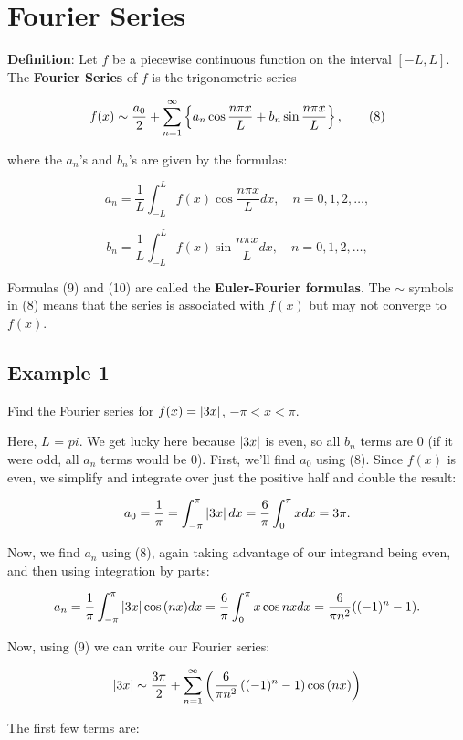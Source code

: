 \documentclass{article}
\begin{document}
\section{Fourier Series}

\textbf{Definition}: Let $f$ be a piecewise continuous function on the \@{interval} $[-L, L]$. The \textbf{Fourier Series} of $f$ is the trigonometric series

\[ f(x) \sim \frac{a_0}{2} + \sum_{n=1}^{\infty} \left\{ a_n \cos{\frac{n \pi x}{L}} + b_n \sin{\frac{n \pi x}{L}} \right\}, \tag{8} \] 

where the $a_n$'s and $b_n$'s are given by the formulas:

\[ a_n = \frac{1}{L} \int_{-L}^{L} f(x) \cos{\frac{n \pi x}{L}} dx, \quad n = 0, 1, 2, \dots, \tag{9} \]

\[ b_n = \frac{1}{L} \int_{-L}^{L} f(x) \sin{\frac{n \pi x}{L}} dx, \quad n = 0, 1, 2, \dots, \tag{10} \]

Formulas (9) and (10) are called the \textbf{Euler-Fourier formulas}. The $\sim$ symbols in (8) means that the series is associated with $f(x)$ but may not converge to $f(x)$.

\subsection{Example 1}

Find the Fourier series for $f(x) = \left| 3x \right|$, $-\pi < x < \pi$.

Here, $L$ = $pi$. We get lucky here because $\left| 3x \right|$ is even, so all $b_n$ terms are 0 (if it were odd, all $a_n$ terms would be 0). First, we'll find $a_0$ using (8). Since $f(x)$ is even, we simplify and integrate over just the positive half and double the result:

\[ a_0 = \frac{1}{\pi} = \int_{-\pi}^{\pi} \left| 3x \right| dx = \frac{6}{\pi} \int_{0}^{\pi} x dx = 3 \pi. \]

Now, we find $a_n$ using (8), again taking advantage of our integrand being even, and then using integration by parts:

\[ a_n = \frac{1}{\pi} \int_{-\pi}^{\pi} \left| 3x \right|\cos{(nx)}dx = \frac{6}{\pi} \int_{0}^{\pi} x \cos{nx} dx = \frac{6}{\pi n^2}((-1)^n - 1). \]

Now, using (9) we can write our Fourier series:

\[ \left| 3x \right| \sim \frac{3\pi}{2} + \sum_{n=1}^{\infty} \left(\frac{6}{\pi n^2} \left((-1)^n - 1\right) \cos{(nx)}\right) \]

The first few terms are:
\end{document}
